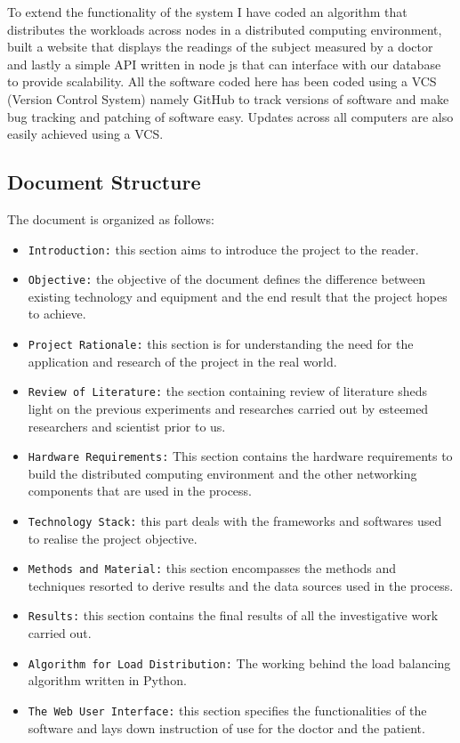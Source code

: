 \documentclass[12pt]{article}
\begin{document}
To extend the functionality of the system I have coded an algorithm that distributes the workloads across nodes in a distributed computing environment, built a website that displays the readings of the subject measured by a doctor and lastly a simple API written in node js that can interface with our database to provide scalability. All the software coded here has been coded using a VCS (Version Control System) namely GitHub to track versions of software and make bug tracking and patching of software easy. Updates across all computers are also easily achieved using a VCS.

\subsection{Document Structure}
The document is organized as follows:
\begin{itemize}
\item \texttt{Introduction:} this section aims to introduce the project to the reader.
\item \texttt{Objective:} the objective of the document defines the difference between existing technology and equipment and the end result that the project hopes to achieve.
\item \texttt{Project Rationale:} this section is for understanding the need for the application and research of the project in the real world.
\item \texttt{Review of Literature:} the section containing review of literature sheds light on the previous experiments and researches carried out by esteemed researchers and scientist prior to us.
\item \texttt{Hardware Requirements:} This section contains the hardware requirements to build the distributed computing environment and the other networking components that are used in the process.
\item \texttt{Technology Stack:} this part deals with the frameworks and softwares used to realise the project objective.
\item \texttt{Methods and Material:} this section encompasses the methods and techniques resorted to derive results and the data sources used in the process.
\item \texttt{Results:} this section contains the final results of all the investigative work carried out.
\item \texttt{Algorithm for Load Distribution:} The working behind the load balancing algorithm written in Python.
\item \texttt{The Web User Interface:} this section specifies the functionalities of the software and lays down instruction of use for the doctor and the patient.

\end{itemize}
\end{document}
